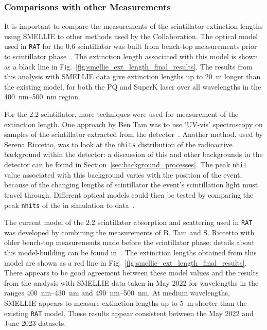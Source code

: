 \subsubsection{Comparisons with other Measurements}\label{sec:smellie_ext_length_comparison}
It is important to compare the measurements of the scintillator extinction lengths using SMELLIE to other methods used by the Collaboration. The optical model used in \texttt{RAT} for the \SI{0.6}{\gpl} scintillator was built from bench-top measurements prior to scintillator phase~\cite{seguiScintillatorModelComparison2015,kaptanogluOpticsOverviewProposed2016}. The extinction length associated with this model is shown as a black line in Fig.~\ref{fig:smellie_ext_length_final_results}. The results from this analysis with SMELLIE data give extinction lengths up to \SI{20}{\metre} longer than the existing model, for both the PQ and SuperK laser over all wavelengths in the \SIrange{400}{500}{\nm} region.

For the \SI{2.2}{\gpl} scintillator, more techniques were used for measurement of the extinction length. One approach by Ben Tam was to use `UV-vis' spectroscopy on samples of the scintillator extracted from the detector~\cite{tamBenchtopAttenuationMeasurements2022,tamEnablingNeutrinolessDoubleBeta2023}. %
Another method, used by Serena Riccetto, was to look at the \texttt{nhits} distribution of the radioactive background  within the detector: a discussion of this and other backgrounds in the detector can be found in Section~\ref{sec:background_processes}. The peak \texttt{nhit} value associated with this background varies with the position of the event, because of the changing lengths of scintillator the event's scintillation light must travel through. Different optical models could then be tested by comparing the peak \texttt{nhits} of the  in simulation to data~\cite{riccettoFullFill2102022}. %

The current model of the \SI{2.2}{\gpl} scintillator absorption and scattering used in \texttt{RAT} was developed by combining the measurements of B. Tam and S. Riccetto with older bench-top measurements made before the scintillator phase: details about this model-building can be found in~\cite{kaptanogluDocumentationAttenuationStudies2022,riccettoRATOptics2g2022}. %
The extinction lengths obtained from this model are shown as a red line in Fig.~\ref{fig:smellie_ext_length_final_results}. There appears to be good agreement between these model values and the results from the analysis with SMELLIE data taken in May 2022 for wavelengths in the ranges \SIrange{400}{430}{\nm} and \SIrange{490}{500}{\nm}. At medium wavelengths, SMELLIE appears to measure extinction lengths up to \SI{5}{\metre} shorter than the existing \texttt{RAT} model. These results appear consistent between the May 2022 and June 2023 datasets.

